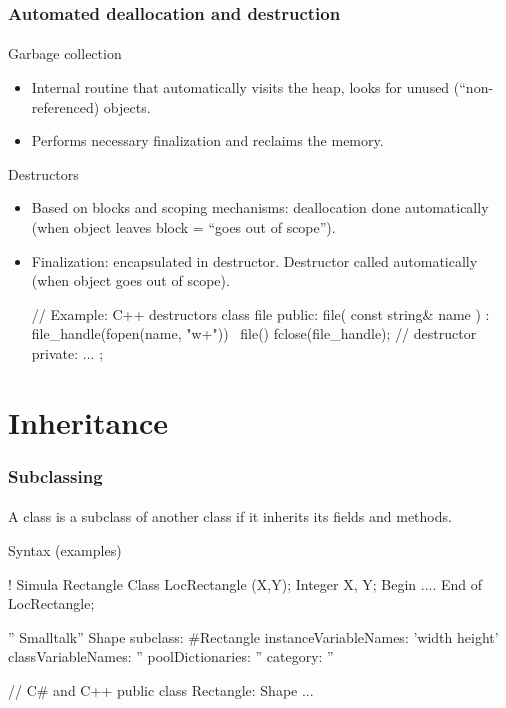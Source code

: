\documentclass{beamer}
\begin{document}
\begin{frame}[fragile]
\frametitle{Automated deallocation and destruction}
\framesubtitle{}
Garbage collection
\begin{itemize}
\item Internal routine that automatically visits the heap, looks for
unused (``non-referenced) objects. 
\item Performs necessary finalization
and reclaims the memory.
\end{itemize}
Destructors 
\begin{itemize}
\item 
Based on blocks and scoping mechanisms: deallocation 
done automatically (when object leaves block = ``goes out of scope'').
\item Finalization: encapsulated in destructor. 
Destructor called automatically 
(when object goes out of scope).
\begin{cplus3}
// Example: C++ destructors  
class file {
public:
   file( const string&  name ) : file_handle(fopen(name, "w+")){}  
   ~file() { fclose(file_handle); }  // destructor
private:
   ...
};
\end{cplus3}
\end{itemize}
\end{frame}





\section{Inheritance}


\begin{frame}[fragile]
\frametitle{Subclassing}
\framesubtitle{}
A class is a subclass of another class if it inherits 
its fields and methods.
\bigskip

Syntax (examples)

\begin{cplus3}
    ! Simula
    Rectangle Class LocRectangle (X,Y); Integer X, Y;
    Begin .... 
    End of LocRectangle;

    '' Smalltalk''
    Shape subclass: #Rectangle
        instanceVariableNames: 'width height'
        classVariableNames: ''
        poolDictionaries: ''
        category: ''

     // C# and C++
     public class Rectangle: Shape 
     {
        ... 
     }

\end{cplus3}

\end{frame}
\end{document}
